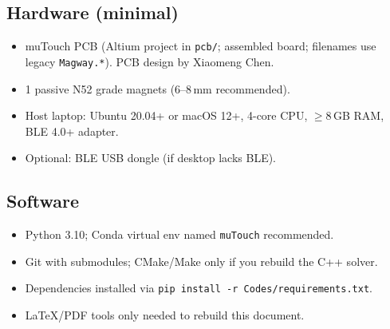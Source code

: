 \documentclass[conference]{IEEEtran}
\begin{document}
\subsection{Hardware (minimal)}
\begin{itemize}
  \item muTouch PCB (Altium project in \texttt{pcb/}; assembled board; filenames use legacy \texttt{Magway.*}). PCB design by Xiaomeng Chen.
  \item 1 passive N52 grade magnets (6--8\,mm recommended).
  \item Host laptop: Ubuntu 20.04+ or macOS 12+, 4-core CPU, $\geq$8\,GB RAM, BLE 4.0+ adapter.
  \item Optional: BLE USB dongle (if desktop lacks BLE).
\end{itemize}
\subsection{Software}
\begin{itemize}
  \item Python 3.10; Conda virtual env named \texttt{muTouch} recommended.
  \item Git with submodules; CMake/Make only if you rebuild the C++ solver.
  \item Dependencies installed via \texttt{pip install -r Codes/requirements.txt}.
  \item LaTeX/PDF tools only needed to rebuild this document.
\end{itemize}
\end{document}
